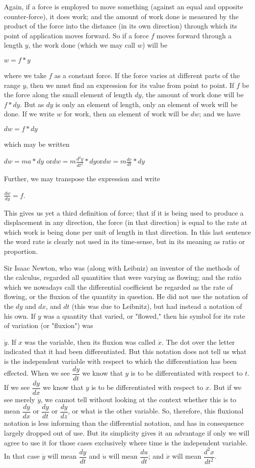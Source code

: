 \documentclass{ximera}
\begin{document}
Again, if a force is employed to move something
(against an equal and opposite counter-force), it does
work; and the amount of work done is measured by
the product of the force into the distance (in its
own direction) through which its point of application
moves forward. So if a force $f$ moves forward
through a length $y$, the work done (which we may
call $w$) will be

$w = f * y$

where we take $f$ as a constant force. If the force
varies at different parts of the range $y$, then we must
find an expression for its value from point to point.
If $f$ be the force along the small element of length $dy$,
the amount of work done will be $f * dy$. But as
$dy$ is only an element of length, only an element of
work will be done. If we write $w$ for work, then an
element of work will be $dw$; and we have

$dw = f * dy$


which may be written

$dw = ma*dy
\text{ or}
dw = m \frac{d^2y}{dt^2}* dy
 \text{or}
dw = m \frac{dv}{dt}* dy$

Further, we may transpose the expression and write

$\frac{dw}{dy} = f$.


This gives us yet a third definition of force; that
if it is being used to produce a displacement in any
direction, the force (in that direction) is equal to the
rate at which work is being done per unit of length
in that direction. In this last sentence the word
rate is clearly not used in its time-sense, but in its
meaning as ratio or proportion.

Sir Isaac Newton, who was (along with Leibniz)
an inventor of the methods of the calculus, regarded
all quantities that were varying as flowing; and the
ratio which we nowadays call the differential coefficient
he regarded as the rate of flowing, or the
fluxion of the quantity in question. He did not use
the notation of the $dy$ and $dx$, and $dt$ (this was due
to Leibnitz), but had instead a notation of his own.
If $y$ was a quantity that varied, or "flowed," then his
symbol for its rate of variation (or "fluxion") was

$\dot{y}$. If $x$ was the variable, then its fluxion was called $\dot{x}$.
The dot over the letter indicated that it had been
differentiated. But this notation does not tell us
what is the independent variable with respect to
which the differentiation has been effected. When
we see $\dfrac{dy}{dt}$ we know that $y$ is to be differentiated with
respect to $t$. If we see $\dfrac{dy}{dx}$ we know that $y$ is to be
differentiated with respect to $x$. But if we see merely $\dot{y}$,
we cannot tell without looking at the context
whether this is to mean $\dfrac{dy}{dx}$ or $\dfrac{dy}{dt}$ or $\dfrac{dy}{dz}$, or what is
the other variable. So, therefore, this fluxional notation
is less informing than the differential notation,
and has in consequence largely dropped out of use.
But its simplicity gives it an advantage if only we
will agree to use it for those cases exclusively where
time is the independent variable. In that case $\dot{y}$ will
mean $\dfrac{dy}{dt}$ and $\dot{u}$ will mean $\dfrac{du}{dt}$;
and $\ddot{x}$ will mean $\dfrac{d^2x}{dt^2}$.
\end{document}
